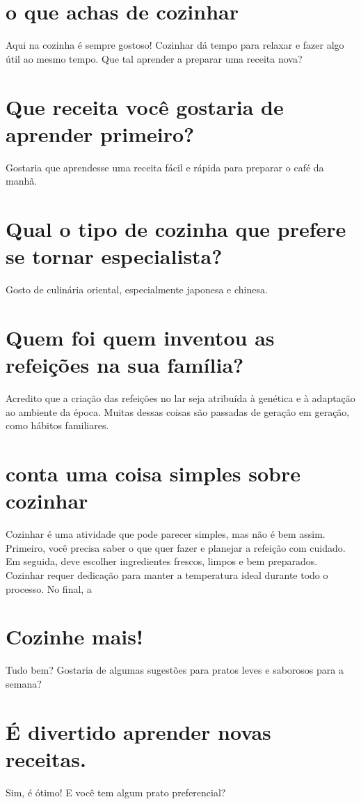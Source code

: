 \documentclass[11pt,a4paper]{article}
\begin{document}
\section{o que achas de cozinhar}
Aqui na cozinha é sempre gostoso! Cozinhar dá tempo para relaxar e fazer algo útil ao mesmo tempo. Que tal aprender a preparar uma receita nova?

\section{Que receita você gostaria de aprender primeiro?}
Gostaria que aprendesse uma receita fácil e rápida para preparar o café da manhã.

\section{Qual o tipo de cozinha que prefere se tornar especialista?}
Gosto de culinária oriental, especialmente japonesa e chinesa.

\section{Quem foi quem inventou as refeições na sua família?}
Acredito que a criação das refeições no lar seja atribuída à genética e à adaptação ao ambiente da época. Muitas dessas coisas são passadas de geração em geração, como hábitos familiares.

\section{conta uma coisa simples sobre cozinhar}
Cozinhar é uma atividade que pode parecer simples, mas não é bem assim. Primeiro, você precisa saber o que quer fazer e planejar a refeição com cuidado. Em seguida, deve escolher ingredientes frescos, limpos e bem preparados. Cozinhar requer dedicação para manter a temperatura ideal durante todo o processo. No final, a

\section{Cozinhe mais!}
Tudo bem? Gostaria de algumas sugestões para pratos leves e saborosos para a semana?

\section{É divertido aprender novas receitas.}
Sim, é ótimo! E você tem algum prato preferencial?
\end{document}
